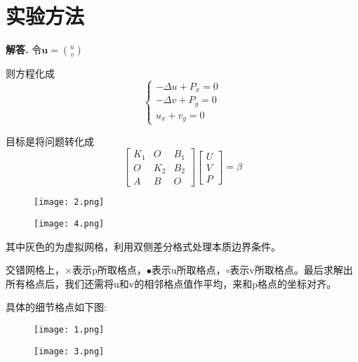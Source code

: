 \documentclass{article}
\newenvironment{solution}{\par\noindent\textbf{解答. }}{\par}
\begin{document}
\section{实验方法}
\begin{solution}	 
令$\textbf{u}=\binom{u}{v}$

则方程化成\begin{equation*}
	\left\{\begin{matrix}
		-\Delta u+P_x=0\\ 
		-\Delta v +P_y=0\\ 
		u_x+v_y=0
	\end{matrix}\right.
\end{equation*}

目标是将问题转化成\begin{equation*}
	\begin{bmatrix}
		K_1 &O  & B_1\\ 
		O& K_2 &B_2 \\ 
		A& B & O
	\end{bmatrix}
	\begin{bmatrix}
		U\\ 
		V\\ 
		P
	\end{bmatrix}=\beta
\end{equation*}
\begin{figure}[htbp]
	\centering
	\begin{minipage}{0.49\linewidth}
		\centering
		\texttt{[image: 2.png]}
	\end{minipage}
	\begin{minipage}{0.49\linewidth}
		\centering
		\texttt{[image: 4.png]}		
	\end{minipage}
\end{figure}

其中灰色的为虚拟网格，利用双侧差分格式处理本质边界条件。

交错网格上，$\times$表示p所取格点，$\bullet$表示u所取格点，$\circ$表示v所取格点。最后求解出所有格点后，我们还需将u和v的相邻格点值作平均，来和p格点的坐标对齐。

具体的细节格点如下图:
\begin{figure}[htbp]
	\centering
	\begin{minipage}{0.49\linewidth}
		\centering
		\texttt{[image: 1.png]}
	\end{minipage}
	\begin{minipage}{0.49\linewidth}
		\centering
		\texttt{[image: 3.png]}		
	\end{minipage}
\end{figure}



\end{solution}
\end{document}
